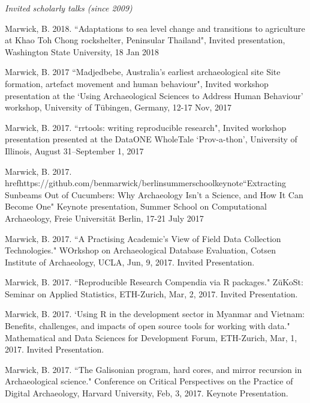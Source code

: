 

\medskip

\noindent\emph{Invited scholarly talks (since 2009)\vspace{0.01in}}

\medskip

\ind Marwick, B. 2018. ``Adaptations to sea level change and transitions to agriculture at Khao Toh Chong rockshelter, Peninsular Thailand", Invited presentation, Washington State University, 18 Jan 2018

\ind Marwick, B. 2017 ``Madjedbebe, Australia's earliest archaeological site Site formation, artefact movement and human behaviour", Invited workshop presentation at the ‘Using Archaeological Sciences to Address Human Behaviour’ workshop, University of Tübingen, Germany, 12-17 Nov, 2017

\ind Marwick, B. 2017. ``rrtools: writing reproducible research", Invited workshop presentation presented at the DataONE WholeTale ‘Prov-a-thon’, University of Illinois, August 31–September 1, 2017

\ind Marwick, B. 2017. href{https://github.com/benmarwick/berlinsummerschoolkeynote}{``Extracting Sunbeams Out of Cucumbers: Why Archaeology Isn't a Science, and How It Can Become One"} Keynote presentation, Summer School on Computational Archaeology, Freie Universität Berlin, 17-21 July 2017

\ind Marwick, B. 2017. ``A Practising Academic’s View of Field Data Collection Technologies." WOrkshop on Archaeological Database Evaluation, Cotsen Institute of Archaeology, UCLA,  Jun, 9, 2017. Invited Presentation.

\ind Marwick, B. 2017. ``Reproducible Research Compendia via R packages." ZüKoSt: Seminar on Applied Statistics, ETH-Zurich,  Mar, 2, 2017. Invited Presentation.

\ind Marwick, B. 2017. `Using R in the development sector in Myanmar and Vietnam: Benefits, challenges, and impacts of open source tools for working with data." Mathematical and Data Sciences for Development Forum, ETH-Zurich,  Mar, 1, 2017. Invited Presentation.

\ind Marwick, B. 2017. ``The Galisonian program, hard cores, and mirror recursion in Archaeological science." Conference on Critical Perspectives on the Practice of Digital Archaeology, Harvard University,  Feb, 3, 2017. Keynote Presentation.

